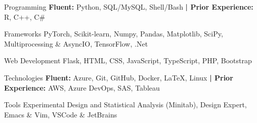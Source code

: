 

\begin{cvskills}


\cvskill
    {Programming} %
    {\textbf{Fluent:} Python, SQL/MySQL, Shell/Bash \textbf{| Prior Experience:} R, C++, C\#} %


\cvskill
    {Frameworks} %
    {PyTorch, Scikit-learn, Numpy, Pandas, Matplotlib, SciPy, Multiprocessing \& AsyncIO, TensorFlow, .Net} %


\cvskill
    {Web Development} %
    {Flask, HTML, CSS, JavaScript, TypeScript, PHP, Bootstrap} %
    

\cvskill
    {Technologies} %
    {\textbf{Fluent:} Azure, Git, GitHub, Docker, LaTeX, Linux \textbf{| Prior Experience:} AWS, Azure DevOps, SAS, Tableau} %
    


\vspace{0.3cm}
\cvskill
    {Tools}
    { Experimental Design and Statistical Analysis (Minitab), Design Expert, Emacs \& Vim, VSCode \& JetBrains}




\end{cvskills}
